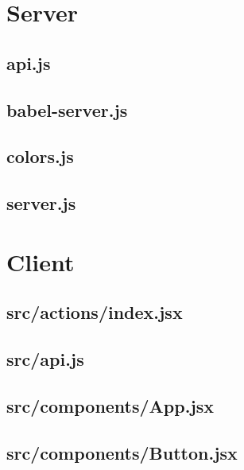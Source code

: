 \section{Server}
\label{app:web_server}
\subsection{api.js}
\label{app:server_api_js}

\subsection{babel-server.js}
\label{app:server_babel_server_js}

\subsection{colors.js}
\label{app:server_colors_js}

\subsection{server.js}
\label{app:server_server_js}

\section{Client}
\label{app:web_client}
\subsection{src/actions/index.jsx}
\label{app:client_src_actions_index_jsx}

\subsection{src/api.js}
\label{app:client_src_api_js}

\subsection{src/components/App.jsx}
\label{app:client_src_components_App_jsx}

\subsection{src/components/Button.jsx}
\label{app:client_src_components_Button_jsx}

